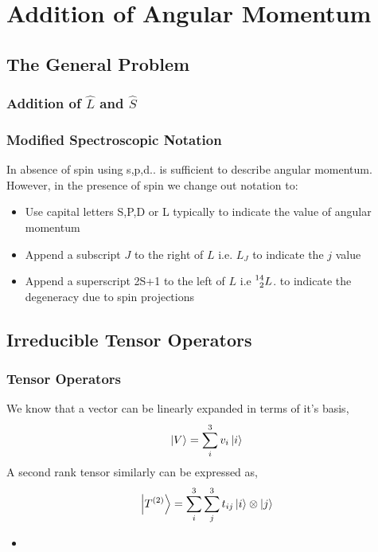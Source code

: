 \chapter{Addition of Angular Momentum}
\section{The General Problem}
\subsection{Addition of $\hat{L}$ and $\hat{S}$}
\subsection{Modified Spectroscopic Notation}
In absence of spin using s,p,d.. is sufficient to describe angular momentum. However, in the presence of spin we change out notation to:
\begin{itemize}
\item Use capital letters S,P,D or L typically to indicate the value of angular momentum
\item Append a subscript $J$ to the right of $L$ i.e. $L_{J}$ to indicate the $j$ value
\item Append a superscript 2S+1 to the left of $L$ i.e $\prescript{14}{2}L$. to indicate the degeneracy due to spin projections
\end{itemize}
\section{Irreducible Tensor Operators}
\subsection{Tensor Operators}
We know that a vector can be linearly expanded in terms of it's basis,
\begin{equation}
\ket{V} = \sum^{3}_{i} v_{i}\ket{i}
\end{equation}
A second rank tensor similarly can be expressed as,
\begin{equation}
	\ket{T^{(2)}} = \sum^{3}_{i}\sum^{3}_{j} t_{ij}\ket{i}\otimes\ket{j}
\end{equation}
\begin{itemize}
\item 
\end{itemize}